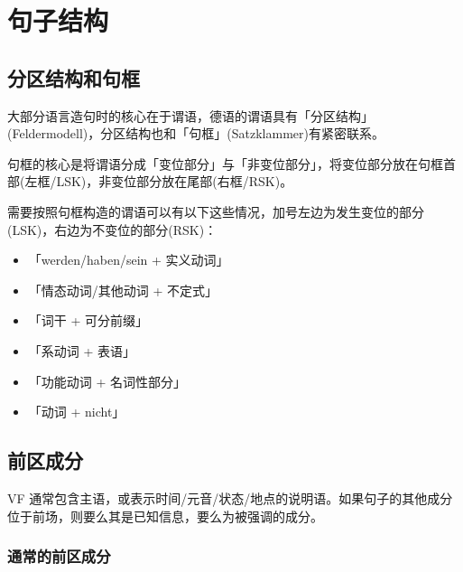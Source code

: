 \section{句子结构}

\subsection{分区结构和句框}
\begin{figure}[H]
    \centering
    
\end{figure}

大部分语言造句时的核心在于谓语，德语的谓语具有「分区结构」(Feldermodell)，分区结构也和「句框」(Satzklammer)有紧密联系。

句框的核心是将谓语分成「变位部分」与「非变位部分」，将变位部分放在句框首部(左框/LSK)，非变位部分放在尾部(右框/RSK)。

需要按照句框构造的谓语可以有以下这些情况，加号左边为发生变位的部分(LSK)，右边为不变位的部分(RSK)：
\begin{itemize}
    \item「werden/haben/sein + 实义动词」
    \item 「情态动词/其他动词 + 不定式」
    \item 「词干 + 可分前缀」
    \item 「系动词 + 表语」
    \item 「功能动词 + 名词性部分」
    \item 「动词 + nicht」
\end{itemize}

\subsection{前区成分}
VF 通常包含主语，或表示时间/元音/状态/地点的说明语。如果句子的其他成分位于前场，则要么其是已知信息，要么为被强调的成分。

\subsubsection{通常的前区成分}

